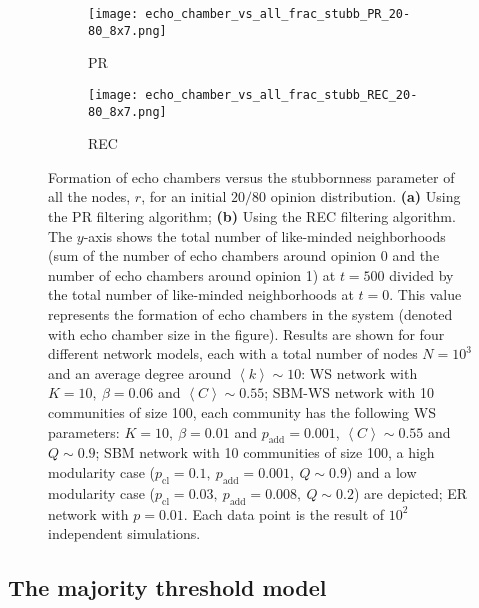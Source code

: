 \documentclass[11 pt , letterpaper , twoside , openright]{book}
\begin{document}
\begin{figure}[H]
  \begin{subfigure}[b]{0.49\textwidth}
  	\texttt{[image: echo\_chamber\_vs\_all\_frac\_stubb\_PR\_20-80\_8x7.png]}
    \caption{PR}
    \label{PR_all_frac_stubb_20-80}
  \end{subfigure}
  \begin{subfigure}[b]{0.49\textwidth}
  	\texttt{[image: echo\_chamber\_vs\_all\_frac\_stubb\_REC\_20-80\_8x7.png]}
    \caption{REC}
    \label{REC_all_frac_stubb_20-80}
  \end{subfigure}
  \captionsetup{format=plain}
  \caption[Formation of echo chambers versus the stubbornness parameter of all the nodes, $r$, for the PR and REC filtering algorithms and an initial $20/80$ opinion distribution]{Formation of echo chambers versus the stubbornness parameter of all the nodes, $r$, for an initial $20/80$ opinion distribution. \textbf{(a)} Using the PR filtering algorithm; \textbf{(b)} Using the REC filtering algorithm. The $y$-axis shows the total number of like-minded neighborhoods (sum of the number of echo chambers around opinion 0 and the number of echo chambers around opinion 1) at $t=500$ divided by the total number of like-minded neighborhoods at $t=0$. This value represents the formation of echo chambers in the system (denoted with echo chamber size in the figure). Results are shown for four different network models, each with a total number of nodes $N=10^3$ and an average degree around $\left<k\right> \sim 10$: WS network with $K =10,\ \beta = 0.06$ and $\left<C\right> \sim 0.55$; SBM-WS network with 10 communities of size 100, each community has the following WS parameters: $K = 10,\ \beta = 0.01$ and $p_{\text{add}} = 0.001$, $\left<C\right> \sim 0.55$ and $Q \sim 0.9$; SBM network with 10 communities of size 100, a high modularity case ($p_{\text{cl}} = 0.1,\ p_{\text{add}} = 0.001,\ Q \sim 0.9$) and a low modularity case ($p_{\text{cl}} = 0.03,\ p_{\text{add}} = 0.008,\ Q \sim 0.2$) are depicted; ER network with $p= 0.01$. Each data point is the result of $10^2$ independent simulations.}
\label{echo_vs_all_frac_stubb_PR-REC_20-80}
\end{figure}

\subsection{The majority threshold model}
\label{majThres}
\end{document}
